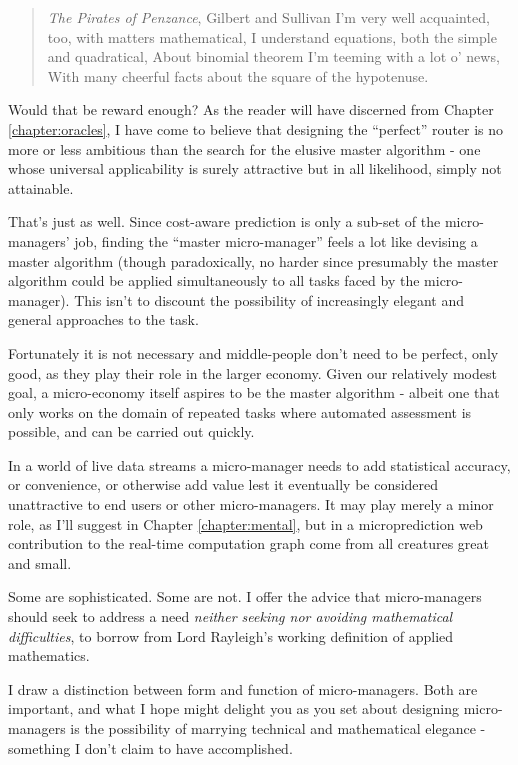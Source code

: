 \begin{quote}{{\em The Pirates of Penzance}, Gilbert and Sullivan}
I'm very well acquainted, too, with matters mathematical,
I understand equations, both the simple and quadratical,
About binomial theorem I'm teeming with a lot o' news,
With many cheerful facts about the square of the hypotenuse.
\end{quote}

Would that be reward enough? As the reader will have discerned from Chapter \ref{chapter:oracles}, I have come to believe that designing the ``perfect'' router is no more or less ambitious than the search for the elusive master algorithm - one whose universal applicability is surely attractive but in all likelihood, simply not attainable. 


That's just as well. Since cost-aware prediction is only a sub-set of the micro-managers' job, finding the ``master micro-manager'' feels a lot like devising a master algorithm (though paradoxically, no harder since presumably the master algorithm could be applied simultaneously to all tasks faced by the micro-manager). This isn't to discount the possibility of increasingly elegant and general approaches to the task.  

Fortunately it is not necessary and middle-people don't need to be perfect, only good, as they play their role in the larger economy. Given our relatively modest goal, a micro-economy itself aspires to be the master algorithm - albeit one that only works on the domain of repeated tasks where automated assessment is possible, and can be carried out quickly. 

In a world of live data streams a micro-manager needs to add statistical accuracy, or convenience, or otherwise add value lest it eventually be considered unattractive to end users or other micro-managers. It may play merely a minor role, as I'll suggest in Chapter \ref{chapter:mental}, but in a microprediction web contribution to the real-time computation graph come from all creatures great and small. 

Some are sophisticated. Some are not. I offer the advice that micro-managers should seek to address a need {\em neither seeking nor avoiding mathematical difficulties}, to borrow from Lord Rayleigh's working definition of applied mathematics. 

I draw a distinction between form and function of micro-managers. Both are important, and what I hope might delight you as you set about designing micro-managers is the possibility of marrying technical and mathematical elegance - something I don't claim to have accomplished. 

